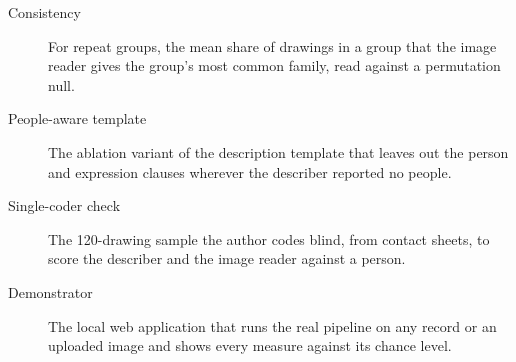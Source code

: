 \begin{description}
\item[Consistency] For repeat groups, the mean share of drawings in a group that the image reader gives the group's most common family, read against a permutation null.
\item[People-aware template] The ablation variant of the description template that leaves out the person and expression clauses wherever the describer reported no people.
\item[Single-coder check] The 120-drawing sample the author codes blind, from contact sheets, to score the describer and the image reader against a person.
\item[Demonstrator] The local web application that runs the real pipeline on any record or an uploaded image and shows every measure against its chance level.
\end{description}
